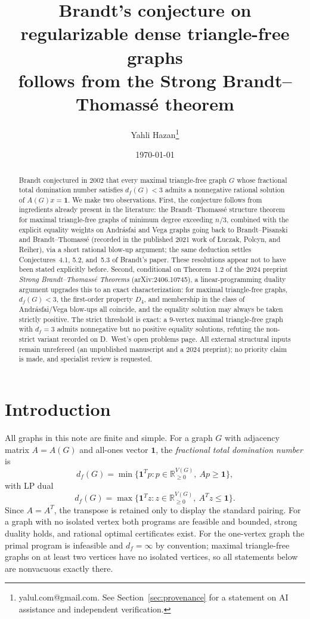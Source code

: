 \documentclass[11pt]{article}
\title{Brandt's conjecture on regularizable dense triangle-free graphs\\
follows from the Strong Brandt--Thomass\'e theorem}
\author{Yahli Hazan\thanks{yalul.com@gmail.com. See Section~\ref{sec:provenance} for a statement on
AI assistance and independent verification.}}
\date{\today}
\theoremstyle{definition}
\theoremstyle{remark}
\newcommand{\df}{d_f}
\newcommand{\ones}{\mathbf 1}
\begin{document}
\maketitle

\begin{abstract}
Brandt conjectured in 2002 that every maximal triangle-free graph $G$ whose fractional total
domination number satisfies $\df(G)<3$ admits a nonnegative rational solution of
$A(G)x=\ones$. We make two observations. First, the conjecture follows from ingredients
already present in the literature: the Brandt--Thomass\'e structure theorem for maximal
triangle-free graphs of minimum degree exceeding $n/3$, combined with the explicit equality
weights on Andr\'asfai and Vega graphs going back to Brandt--Pisanski and
Brandt--Thomass\'e (recorded in the published 2021 work of \L{}uczak, Polcyn, and Reiher),
via a short rational blow-up argument; the same deduction settles Conjectures~4.1, 5.2,
and~5.3 of Brandt's paper. These resolutions appear not to have been stated explicitly
before. Second, conditional on Theorem~1.2 of the 2024 preprint \emph{Strong
Brandt--Thomass\'e Theorems} (arXiv:2406.10745), a linear-programming duality argument
upgrades this to an exact characterization: for maximal triangle-free graphs, $\df(G)<3$,
the first-order property $D_4$, and membership in the class of Andr\'asfai/Vega blow-ups
all coincide, and the equality solution may always be taken strictly positive. The strict
threshold is exact: a $9$-vertex maximal triangle-free graph with $\df=3$ admits
nonnegative but no positive equality solutions, refuting the non-strict variant recorded on
D.~West's open problems page. All external structural inputs remain unrefereed (an
unpublished manuscript and a 2024 preprint); no priority claim is made, and specialist
review is requested.
\end{abstract}

\section{Introduction}

All graphs in this note are finite and simple. For a graph $G$ with adjacency matrix
$A=A(G)$ and all-ones vector $\ones$, the \emph{fractional total domination number} is
\begin{equation}\label{eq:primal}
\df(G)=\min\bigl\{\ones^Tp : p\in\mathbb R^{V(G)}_{\ge0},\ Ap\ge\ones\bigr\},
\end{equation}
with LP dual
\begin{equation}\label{eq:dual}
\df(G)=\max\bigl\{\ones^Tz : z\in\mathbb R^{V(G)}_{\ge0},\ A^Tz\le\ones\bigr\}.
\end{equation}
Since $A=A^T$, the transpose is retained only to display the standard pairing. For a graph
with no isolated vertex both programs are feasible and bounded, strong duality holds, and
rational optimal certificates exist. For the one-vertex graph the primal program is
infeasible and $\df=\infty$ by convention; maximal triangle-free graphs on at least two
vertices have no isolated vertices, so all statements below are nonvacuous exactly there.
\end{document}
